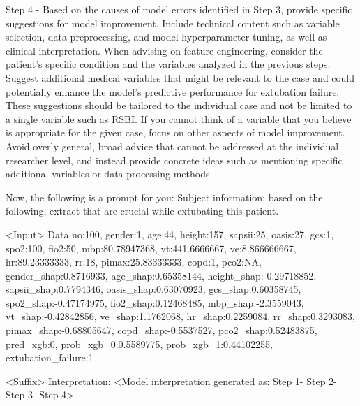 Step 4 - Based on the causes of model errors identified in Step 3, provide specific suggestions for model improvement. Include technical content such as variable selection, data preprocessing, and model hyperparameter tuning, as well as clinical interpretation. When advising on feature engineering, consider the patient's specific condition and the variables analyzed in the previous steps. Suggest additional medical variables that might be relevant to the case and could potentially enhance the model's predictive performance for extubation failure. These suggestions should be tailored to the individual case and not be limited to a single variable such as RSBI. If you cannot think of a variable that you believe is appropriate for the given case, focus on other aspects of model improvement.
Avoid overly general, broad advice that cannot be addressed at the individual researcher level, and instead provide concrete ideas such as mentioning specific additional variables or data processing methods.

Now, the following is a prompt for you: Subject information; based on the following, extract that are crucial while extubating this patient.

<Input>
Data no:100, gender:1, age:44, height:157, sapsii:25, oasis:27, gcs:1, spo2:100, fio2:50, mbp:80.78947368, vt:441.6666667, ve:8.866666667, hr:89.23333333, rr:18, pimax:25.83333333, copd:1, pco2:NA, gender_shap:0.8716933, age_shap:0.65358144, height_shap:-0.29718852, sapsii_shap:0.7794346, oasis_shap:0.63070923, gcs_shap:0.60358745, spo2_shap:-0.47174975, fio2_shap:0.12468485, mbp_shap:-2.3559043, vt_shap:-0.42842856, ve_shap:1.1762068, hr_shap:0.2259084, rr_shap:0.3293083, pimax_shap:-0.68805647, copd_shap:-0.5537527, pco2_shap:0.52483875, pred_xgb:0, prob_xgb_0:0.5589775, prob_xgb_1:0.44102255, extubation_failure:1

<Suffix>
Interpretation:
<Model interpretation generated as:
Step 1-
Step 2-
Step 3-
Step 4>